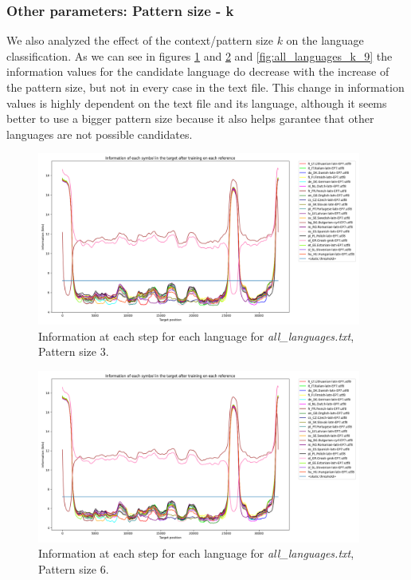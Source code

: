 \documentclass{article}
\begin{document}
\subsubsection{Other parameters: Pattern size - k}
\label{subsubsec:results_locate_lang_pattern_size}

We also analyzed the effect of the context/pattern size $k$ on the language classification.
As we can see in figures \ref{fig:all_languages_k_3} and \ref{fig:all_languages_k_6} and \ref{fig:all_languages_k_9} 
the information values for the candidate language do decrease with the increase of the pattern size, but not in every case in the text file.
This change in information values is highly dependent on the text file and its language, although it seems better to use a bigger pattern size
because it also helps garantee that other languages are not possible candidates.

\begin{figure}
    \centering
    \includegraphics[width=0.95\textwidth]{../results/all_languages/-k_3_-a_1.png}
    \caption{Information at each step for each language for \textit{all\_languages.txt}, Pattern size 3.}
    \label{fig:all_languages_k_3}
\end{figure}

\begin{figure}
    \centering
    \includegraphics[width=0.95\textwidth]{../results/all_languages/-k_6_-a_1.png}
    \caption{Information at each step for each language for \textit{all\_languages.txt}, Pattern size 6.}
    \label{fig:all_languages_k_6}
\end{figure}
\end{document}
